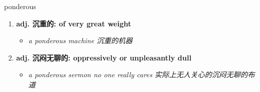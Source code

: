 
\begin{frame}
{\huge ponderous}
\begin{center}
\begin{enumerate}\Large
  \item \textbf{adj. 沉重的: of very great weight}
  \begin{itemize}
    \item \em{\Large{a ponderous machine 沉重的机器}}
  \end{itemize}
  \item \textbf{adj. 沉闷无聊的: oppressively or unpleasantly dull}
  \begin{itemize}
    \item \em{\Large{a ponderous sermon no one really cares 实际上无人关心的沉闷无聊的布道}}
  \end{itemize}
\end{enumerate}
\end{center}
\end{frame}
